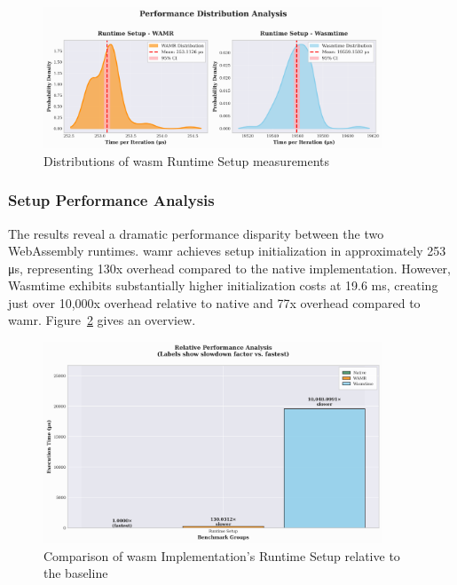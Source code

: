 \begin{figure}[h]
    \centering
    \includegraphics[width=0.9\textwidth]{images/wasm-setup-distribution}
    \caption{Distributions of \acrshort{wasm} Runtime Setup measurements}
    \label{fig:wasm-setup-distribution}
\end{figure}

\subsubsection{Setup Performance Analysis}
The results reveal a dramatic performance disparity between the two WebAssembly runtimes. \acrshort{wamr} achieves setup initialization in approximately 253 μs, representing 130x overhead compared to the native implementation. However, Wasmtime exhibits substantially higher initialization costs at 19.6 ms, creating just over 10,000x overhead relative to native and 77x overhead compared to \acrshort{wamr}. Figure~\ref{fig:wasm-setup-relative} gives an overview.

\begin{figure}[h]
    \centering
    \includegraphics[width=0.9\textwidth]{images/wasm-setup-relative}
    \caption{Comparison of \acrshort{wasm} Implementation's Runtime Setup relative to the baseline}
    \label{fig:wasm-setup-relative}
\end{figure}

